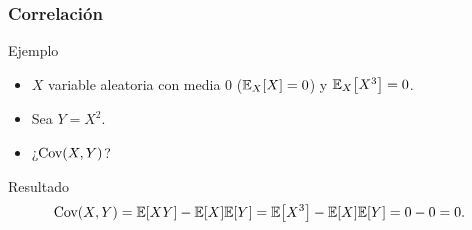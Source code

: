 \documentclass[table]{beamer}
\begin{document}
\begin{frame}
    \frametitle{Correlación}
    \begin{block}{Ejemplo}
        \begin{itemize}
            \item $X$ variable aleatoria con media $0$ ($\expecteddist{X}{X} = 0$) y $\expecteddist{X}{X^{3}} = 0$.
            \item Sea $Y = X^{2}$.
            \item ¿$\cov{X , Y}$?
        \end{itemize}
    \end{block}
    \begin{block}{Resultado}
        \begin{equation*}
            \cov{X , Y} = \expected{X Y} - \expected{X} \expected{Y}
            = \expected{X^{3}} - \expected{X} \expected{Y}
            = 0 - 0 = 0 .
        \end{equation*}
    \end{block}
\end{frame}


\iffalse
\begin{frame}
    \frametitle{Paradoja de Berkson}
    \begin{center}
        \texttt{[image: paradoja\_berkson]}
    \end{center}
    \begin{block}{Paradoja de Berkson}
        \begin{itemize}
            \item Probabilidad condicional puede generar dependencia.
            \item Correlación -0.77.
        \end{itemize}
    \end{block}
\end{frame}

\begin{frame}
    \frametitle{XKCD}
    \begin{center}
        \texttt{[image: correlation]}
    \end{center}
\end{frame}
\fi
\end{document}
